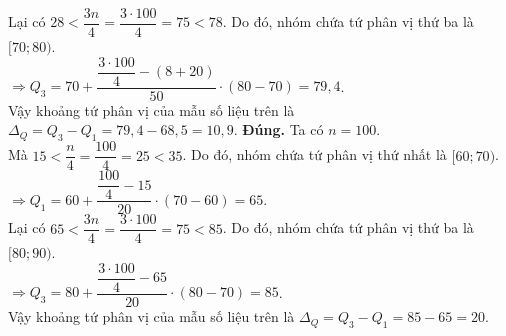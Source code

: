 \begin{ex}
{\begin{itemchoice}
		Lại có $28<\dfrac{3n}{4}=\dfrac{3 \cdot 100}{4}=75<78$. Do đó, nhóm chứa tứ phân vị thứ ba là $[70;80)$.\\
		$\Rightarrow Q_3=70+\dfrac{\dfrac{3 \cdot 100}{4}-(8+20)}{50} \cdot(80-70)=79{,}4$.\\
		Vậy khoảng tứ phân vị của mẫu số liệu trên là $\Delta_Q=Q_3-Q_1=79{,}4-68{,}5=10{,}9$.
		\itemch \textbf{Đúng.} Ta có $n=100$.\\
		Mà $15<\dfrac{n}{4}=\dfrac{100}{4}=25<35$. Do đó, nhóm chứa tứ phân vị thứ nhất là $[60;70)$.\\
		$\Rightarrow Q_1=60+\dfrac{\dfrac{100}{4}-15}{20} \cdot(70-60)=65$.\\
		Lại có $65<\dfrac{3n}{4}=\dfrac{3 \cdot 100}{4}=75<85$. Do đó, nhóm chứa tứ phân vị thứ ba là $[80;90)$.\\
		$\Rightarrow Q_3=80+\dfrac{\dfrac{3 \cdot 100}{4}-65}{20} \cdot(80-70)=85$.\\
		Vậy khoảng tứ phân vị của mẫu số liệu trên là $\Delta_Q=Q_3-Q_1=85-65=20$.
	\end{itemchoice}
}
\end{ex}

